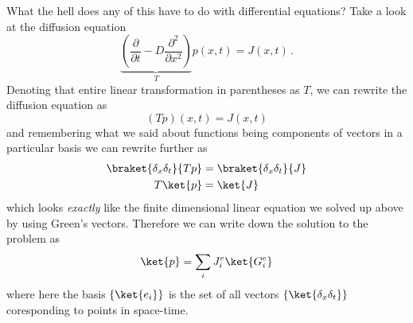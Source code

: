 What the hell does any of this have to do with differential equations?
Take a look at the diffusion equation
\begin{equation*}
  \underbrace{\left( \frac{\partial}{\partial t} - D \frac{\partial^2}{\partial x^2} \right)}_T p(x, t) = J(x, t)
  \, .
\end{equation*}
Denoting that entire linear transformation in parentheses as $T$, we can rewrite the diffusion equation as
\begin{equation*}
  (T p) (x, t) = J(x, t)
\end{equation*}
and remembering what we said about functions being components of vectors in a particular basis we can rewrite further as
\begin{align*}
  \braket{\delta_x \delta_t}{T p} &= \braket{\delta_x \delta_t}{J} \\
  T \ket{p} &= \ket{J}
\end{align*}
which looks \emph{exactly} like the finite dimensional linear equation we solved up above by using Green's vectors.
Therefore we can write down the solution to the problem as
\begin{equation*}
  \ket{p} = \sum_i J_i^e \ket{G_i^e}
\end{equation*}
where here the basis $\{\ket{e_i} \}$ is the set of all vectors $\{\ket{\delta_x \delta_t}\}$ coresponding to points in space-time.

